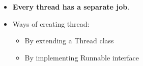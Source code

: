\setlength{\columnsep}{3pt}
\begin{flushleft}
	
	\begin{itemize}
		\item \textbf{Every thread has a separate job}.
		\item Ways of creating thread:
		\begin{itemize}
			\item By extending a Thread class 
			\item By implementing Runnable interface
		\end{itemize}
	\end{itemize}
	
\end{flushleft}




